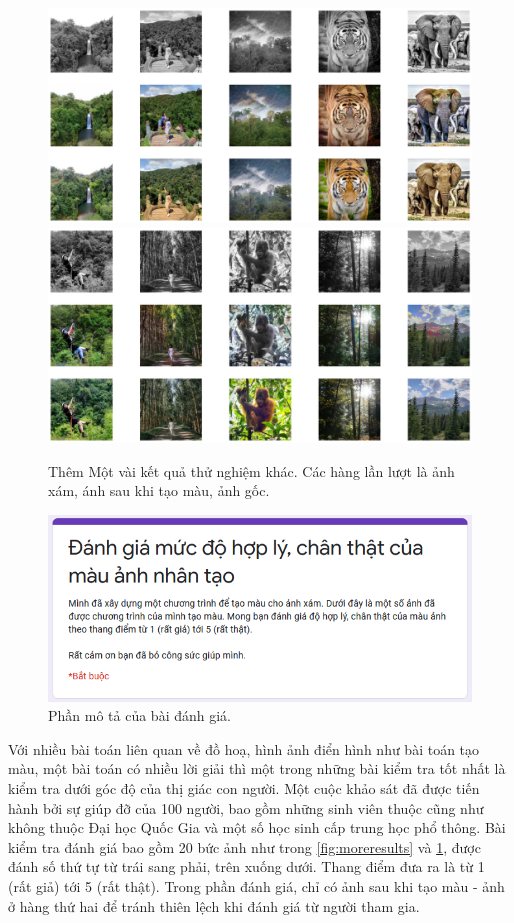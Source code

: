 \documentclass[a4paper, 12pt]{article}
\begin{document}
\begin{figure}[!h]
\captionsetup{width=0.8\textwidth}
\centering
\includegraphics[width=15cm]{images/demo3.png}
\includegraphics[width=15cm]{images/demo4.png}
\caption{Thêm Một vài kết quả thử nghiệm khác. Các hàng lần lượt là ảnh xám, ánh sau khi tạo màu, ảnh gốc.}
\label{fig:onemoreresults}
\end{figure}

\begin{figure}[!h]
\captionsetup{width=0.8\textwidth}
\centering
\includegraphics[width=12cm]{images/question.PNG}
\caption{Phần mô tả của bài đánh giá.}
\end{figure}

\noindent
Với nhiều bài toán liên quan về đồ hoạ, hình ảnh điển hình như bài toán tạo màu, một bài toán có nhiều lời giải thì một trong những bài kiểm tra tốt nhất là kiểm tra dưới góc độ của thị giác con người. Một cuộc khảo sát đã được tiến hành bởi sự giúp đỡ của 100 người, bao gồm những sinh viên thuộc cũng như không thuộc Đại học Quốc Gia và một số học sinh cấp trung học phổ thông. Bài kiểm tra đánh giá bao gồm 20 bức ảnh như trong \ref{fig:moreresults} và \ref{fig:onemoreresults}, được đánh số thứ tự từ trái sang phải, trên xuống dưới. Thang điểm đưa ra là từ 1 (rất giả) tới 5 (rất thật). Trong phần đánh giá, chỉ có ảnh sau khi tạo màu - ảnh ở hàng thứ hai để tránh thiên lệch khi đánh giá từ người tham gia.
\end{document}
